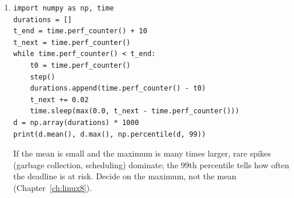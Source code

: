 \begin{enumerate}[label=\textbf{\ansnum.\arabic*}]
  \item[\textbf{\ansnum.10}]
\begin{verbatim}
import numpy as np, time
durations = []
t_end = time.perf_counter() + 10
t_next = time.perf_counter()
while time.perf_counter() < t_end:
    t0 = time.perf_counter()
    step()
    durations.append(time.perf_counter() - t0)
    t_next += 0.02
    time.sleep(max(0.0, t_next - time.perf_counter()))
d = np.array(durations) * 1000
print(d.mean(), d.max(), np.percentile(d, 99))
\end{verbatim}
  If the mean is small and the maximum is many times larger, rare spikes (garbage collection, scheduling) dominate; the $99$th percentile tells how often the deadline is at risk. Decide on the maximum, not the mean (Chapter~\ref{ch:linux8}).
\end{enumerate}
